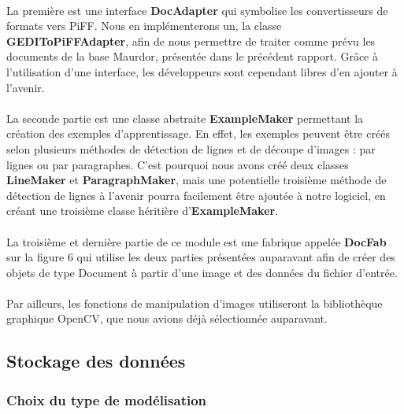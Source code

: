 \paragraph{}

La première est  une interface \textbf{DocAdapter} qui symbolise les
convertisseurs de formats vers PiFF. Nous en implémenterons un, la classe
\textbf{GEDIToPiFFAdapter}, afin de nous permettre de traiter comme prévu les
documents de la base Maurdor, présentée dans le précédent rapport. Grâce à
l’utilisation d’une interface, les développeurs sont cependant libres d’en
ajouter à l’avenir.

\paragraph{}

La seconde partie est une classe abstraite \textbf{ExampleMaker} permettant
la création des exemples d’apprentissage. En effet, les exemples peuvent être
créés selon plusieurs méthodes de détection de lignes et de découpe d’images :
par lignes ou par paragraphes. C’est pourquoi nous avons créé deux classes
\textbf{LineMaker} et \textbf{ParagraphMaker}, mais une potentielle troisième
méthode de détection de lignes à l’avenir pourra facilement être ajoutée à
notre logiciel, en créant une troisième classe héritière
d’\textbf{ExampleMaker}.

\paragraph{}

La troisième et dernière partie de ce module est une fabrique appelée
\textbf{DocFab} sur la figure 6 qui utilise les deux parties présentées
auparavant afin de créer des objets de type Document à partir d’une image et
des données du fichier d’entrée.

\paragraph{}

Par ailleurs, les fonctions de manipulation d’images utiliseront la bibliothèque graphique OpenCV, que nous avions déjà sélectionnée auparavant.

\subsection{Stockage des données}

\subsubsection{Choix du type de modélisation}

